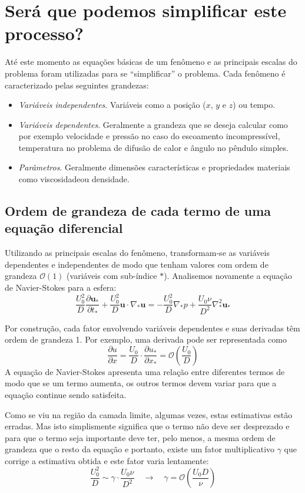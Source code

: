 \documentclass[article,12pt,oneside,a4paper,english,brazil,sumario=tradicional]{abntex2}
\newcommand{\p}[1]{\ensuremath{ \mathbf{#1}}}    %
\newcommand{\lra}{\ensuremath{\longrightarrow}}
\newcommand{\qrq}{\ensuremath{\quad\lra\quad}}
\newcommand{\pd}{\ensuremath{\partial}}
\newcommand{\bigO}[1]{\ensuremath{\mathcal{O}\left(#1\right)}}
\begin{document}
\section{Será que podemos simplificar este processo?}

Até este momento as equações básicas de um fenômeno e as principais escalas do problema foram utilizadas para se ``simplificar'' o problema. Cada fenômeno é caracterizado pelas seguintes grandezas:
\begin{itemize}
\item \emph{Variáveis independentes}. Variáveis como a posição ($x$, $y$ e $z$) ou tempo.
\item \emph{Variáveis dependentes}. Geralmente a grandeza que se deseja calcular como por exemplo velocidade e pressão no caso do escoamento incompressível, temperatura no problema de difusão de calor e ângulo no pêndulo simples.
\item \emph{Parâmetros}. Geralmente dimensões características e propriedades materiais como viscosidadeou densidade. 
\end{itemize}

\subsection{Ordem de grandeza de cada termo de uma equação diferencial}
Utilizando as principais escalas do fenômeno, transformam-se as variáveis dependentes e independentes de modo que tenham valores com ordem de grandeza $\bigO{1}$ (variáveis com sub-índice $*$). Analisemos novamente a equação de Navier-Stokes para a esfera:
\begin{equation}
\frac{U_0^2}{D}\frac{\pd\p{u_*}}{\pd t_*} + \frac{U_0^2}{D}\p{u}\cdot\nabla_*\p{u} = -\frac{U_0^2}{D}\nabla_* p + \frac{U_0\nu}{D^2}\nabla_*^2\p{u_*} 
\label{eq:ns2}
\end{equation}

Por construção, cada fator envolvendo variáveis dependentes e suas derivadas têm ordem de grandeza 1. Por exemplo, uma derivada pode ser representada como 
\[
\frac{\pd u}{\pd x} = \frac{U_0}{D}\cdot\frac{\pd u_*}{\pd x_*} = \bigO{\frac{U_0}{D}}
\]
A equação de Navier-Stokes apresenta uma relação entre diferentes termos de modo que se um termo aumenta, os outros termos devem variar para que a equação continue sendo satisfeita.

Como se viu na região da camada limite, algumas vezes, estas estimativas estão erradas. Mas isto simplismente significa que o termo não deve ser desprezado e para que o termo seja importante deve ter, pelo menos, a mesma ordem de grandeza que o resto da equação e portanto, existe um fator multiplicativo $\gamma$ que corrige a estimativa obtida e este fator varia lentamente:
\[
\frac{U_0^2}{D} \sim \gamma \cdot \frac{U_0\nu}{D^2} \qrq \gamma = \bigO{\frac{U_0 D}{\nu}}
\]
\end{document}
